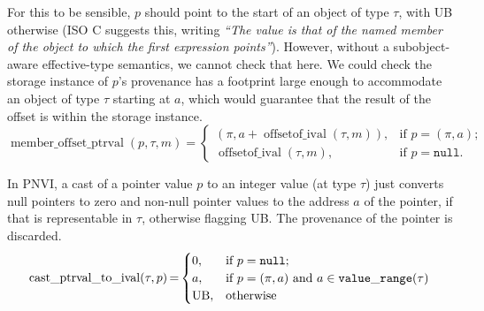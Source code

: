 \documentclass[acmsmall,review,screen]{acmart}\settopmatter{printfolios=true,printccs=false,printacmref=false}
\newcommand{\myparagraph}[1]{\vspace{0.5\baselineskip}\par\noindent{\normalsize\bfseries{#1}}\quad}
\DeclareMathOperator{\intcastPtr}{cast\_ptrval\_to\_ival} %
\DeclareMathOperator{\offsetofIval}{offsetof\_ival}
\DeclareMathOperator{\memberOffset}{member\_offset\_ptrval}
\newcommand{\Null}{\mathtt{null}} %
\begin{document}
For this to be sensible,  
$p$ should point to the start of an object of type $\tau$, with UB otherwise
(ISO C suggests this, writing \emph{``The value is that of the named
member of the object to which the first expression points''}). 
However, without a
subobject-aware effective-type semantics, we cannot check that
here. We could check the storage instance of $p$'s provenance has
a footprint large enough to accommodate an object of type $\tau$
starting at $a$, which would guarantee that the result of the offset
is within the storage instance. 
\[
    \memberOffset(p, \tau, m) =
    \begin{cases}
      (\pi, a + \offsetofIval(\tau, m)),
        &\text{if $p = (\pi, a)$;} \\
      \offsetofIval(\tau, m),
        &\text{if $p = \Null$.}
    \end{cases}
\]



%
%

\myparagraph{Casts (PNVI)}
In PNVI, a cast of a pointer value $p$  to an integer value (at type $\tau$)
just converts null pointers to zero and non-null pointer values to the
address $a$ of the pointer, if that is representable in $\tau$,
otherwise flagging UB.  The provenance of the pointer is discarded. 
\[ \begin{array}{@{}r@{\,}c@{\,}l@{}}
\intcastPtr(\tau, p) &=&
    \begin{cases}
       0,
        &\text{if } p = \Null; \\
       a,
        &\text{if } p = (\pi, a) \text{ and } a \in \mathtt{value\_range}(\tau) \\
      \text{UB},
        &\text{otherwise}
    \end{cases}
\end{array}
\]
\end{document}
